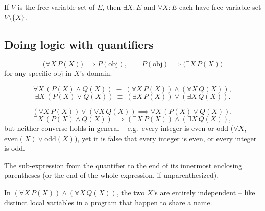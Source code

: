 \documentclass[11pt]{article}
\begin{document}
\begin{note}
If $V$ is the free-variable set of $E$, then $\exists X: E$ and $\forall X: E$ each have free-variable set $V\setminus\{X\}$.
\end{note}

\subsection{Doing logic with quantifiers}
\label{sec:5-12}

\begin{note}
\[
\big(\forall X\, P(X)\big) \implies P(\mathrm{obj}), \qquad P(\mathrm{obj}) \implies \big(\exists X\, P(X)\big)
\]
for any specific $\mathrm{obj}$ in $X$'s domain.
\end{note}

\begin{theorem}
\[
\forall X\,(P(X)\wedge Q(X)) \ \equiv\ (\forall X\, P(X)) \wedge (\forall X\, Q(X)),
\]
\[
\exists X\,(P(X)\vee Q(X)) \ \equiv\ (\exists X\, P(X)) \vee (\exists X\, Q(X)).
\]
\end{theorem}

\begin{note}
\[
(\forall X\, P(X)) \vee (\forall X\, Q(X)) \implies \forall X\,(P(X)\vee Q(X)),
\]
\[
\exists X\,(P(X)\wedge Q(X)) \implies (\exists X\, P(X)) \wedge (\exists X\, Q(X)),
\]
but neither converse holds in general -- e.g.\ every integer is even or odd ($\forall X$, $\mathrm{even}(X)\vee\mathrm{odd}(X)$), yet it is false that every integer is even, or every integer is odd.
\end{note}

\begin{definition}
The sub-expression from the quantifier to the end of its innermost enclosing parentheses (or the end of the whole expression, if unparenthesized).
\end{definition}

\begin{example}
In $(\forall X\, P(X)) \wedge (\forall X\, Q(X))$, the two $X$'s are entirely independent -- like distinct local variables in a program that happen to share a name.
\end{example}
\end{document}
